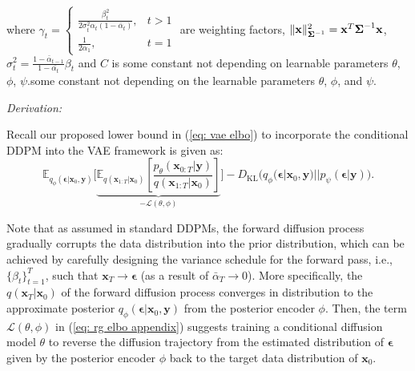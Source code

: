 {\begin{equation*}
\begin{aligned}
\end{aligned}
\end{equation*}
where $\gamma_t= \begin{cases} \frac{\beta_t^2}{2\sigma_t^2\alpha_t(1-\bar{\alpha}_t)}, & t>1 \\ \frac{1}{2\alpha_1}, & t=1\end{cases}$ are weighting factors, $\lVert\mathbf{x}\rVert^2_{\boldsymbol{\Sigma}^{-1}}=\mathbf{x}^T\boldsymbol{\Sigma}^{-1}\mathbf{x}$, $\sigma_t^2=\frac{1-\bar{\alpha}_{t-1}}{1-\bar{\alpha_t}}\beta_t$ and $C$ is some constant not depending on learnable parameters $\theta$, $\phi$, $\psi$.some constant not depending on the learnable parameters $\theta$, $\phi$, and $\psi$.
}

\vspace{0.25cm}

\textit{Derivation:}

Recall our proposed lower bound in (\ref{eq: vae elbo}) to incorporate the conditional DDPM into the VAE framework is given as:
\begin{equation}
    \mathbb{E}_{q_{\phi}(\boldsymbol{\epsilon}|\mathbf{x}_0,\mathbf{y})}\Biggr[\underbrace{\mathbb{E}_{q(\mathbf{x}_{1:T}|\mathbf{x}_0)}\left[\frac{p_{\theta}(\mathbf{x}_{0:T}|\mathbf{y})}{q(\mathbf{x}_{1:T}|\mathbf{x}_0)}\right]}_{-\mathcal{L}(\theta,\phi)}\Biggr] - D_{\text{KL}}\bigr(q_{\phi}(\boldsymbol{\epsilon}|\mathbf{x}_0,\mathbf{y}) || p_{\psi}(\boldsymbol{\epsilon}|\mathbf{y})\bigr).
\label{eq: rg elbo appendix}
\end{equation}

Note that as assumed in standard DDPMs, the forward diffusion process gradually corrupts the data distribution into the prior distribution, which can be achieved by carefully designing the variance schedule for the forward pass, i.e., $\{\beta_t\}_{t=1}^T$, such that $\mathbf{x}_T\to\boldsymbol{\epsilon}$ (as a result of $\bar{\alpha}_T\to0$). More specifically, the 
$q(\mathbf{x}_T|\mathbf{x}_0)$ of the forward diffusion process converges in distribution to the approximate posterior $q_{\phi}(\boldsymbol{\epsilon}|\mathbf{x}_0,\mathbf{y})$ from the posterior encoder $\phi$. Then, the term $\mathcal{L}(\theta,\phi)$ in (\ref{eq: rg elbo appendix}) suggests training a conditional diffusion model $\theta$ to reverse the diffusion trajectory from the estimated distribution of $\boldsymbol{\epsilon}$ given by the posterior encoder $\phi$ back to the target data distribution of $\mathbf{x}_0$. 

